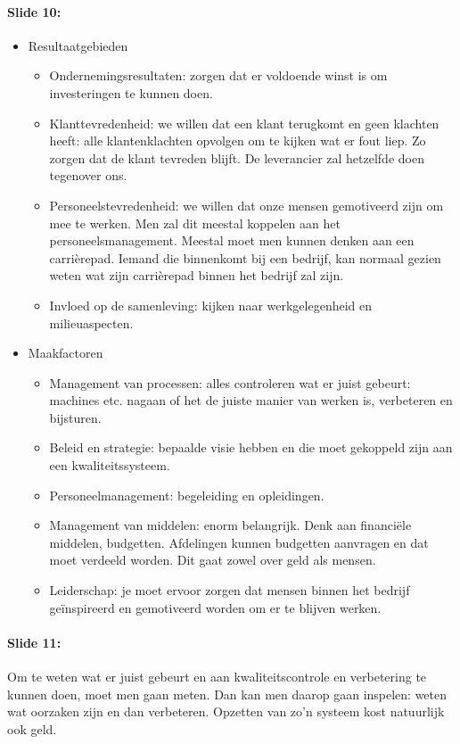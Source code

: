 \documentclass[10pt,a4paper]{report}
\begin{document}
\paragraph{Slide 10:}
\begin{itemize} 
\item Resultaatgebieden
\begin{itemize}
\item Ondernemingsresultaten: zorgen dat er voldoende winst is om investeringen te kunnen doen.
\item Klanttevredenheid: we willen dat een klant terugkomt en geen klachten heeft: alle klantenklachten opvolgen om te kijken wat er fout liep. Zo zorgen dat de klant tevreden blijft. De leverancier zal hetzelfde doen tegenover ons.
\item Personeelstevredenheid: we willen dat onze mensen gemotiveerd zijn om mee te werken. Men zal dit meestal koppelen aan het personeelsmanagement. Meestal moet men kunnen denken aan een carri\`erepad. Iemand die binnenkomt bij een bedrijf, kan normaal gezien weten wat zijn carri\`erepad binnen het bedrijf zal zijn. 
\item Invloed op de samenleving: kijken naar werkgelegenheid en milieuaspecten.
\end{itemize}
\item Maakfactoren
\begin{itemize}
\item Management van processen: alles controleren wat er juist gebeurt: machines etc. nagaan of het de juiste manier van werken is, verbeteren en bijsturen.
\item Beleid en strategie: bepaalde visie hebben en die moet gekoppeld zijn aan een kwaliteitssysteem.
\item Personeelmanagement: begeleiding en opleidingen.
\item Management van middelen: enorm belangrijk. Denk aan financi\"ele middelen, budgetten. Afdelingen kunnen budgetten aanvragen en dat moet verdeeld worden. Dit gaat zowel over geld als mensen. 
\item Leiderschap: je moet ervoor zorgen dat mensen binnen het bedrijf ge\"inspireerd en gemotiveerd worden om er te blijven werken.
\end{itemize}
\end{itemize}

\paragraph{Slide 11:} Om te weten wat er juist gebeurt en aan kwaliteitscontrole en verbetering te kunnen doen, moet men gaan meten. Dan kan men daarop gaan inspelen: weten wat oorzaken zijn en dan verbeteren.
Opzetten van zo'n systeem kost natuurlijk ook geld.
\end{document}
